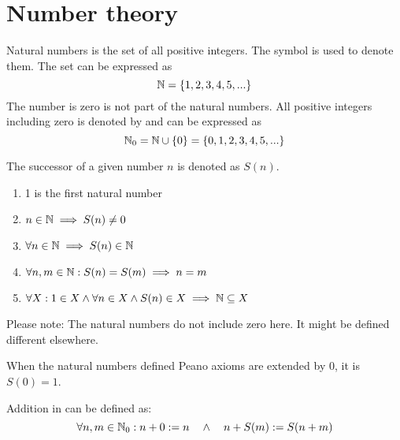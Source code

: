 \chapter{Number theory}

\begin{definition}
    Natural numbers is the set of all positive integers.
    The symbol \N{} is used to denote them.
    The set can be expressed as
    \begin{equation}
        \mathbb{N} = \{1,2,3,4,5,... \}
    \end{equation}
    The number is zero is not part of the natural numbers.
    All positive integers including zero is denoted by \Nzero{} and can be expressed as
    \begin{equation}
        \mathbb{N}_0 = \mathbb{N} \cup \{0\} = \{0, 1,2,3,4,5,... \}
    \end{equation}
\end{definition}

\begin{definition}
    The successor of a given number $n$ is denoted as $S(n)$.
    \begin{enumerate}
        \item 1 is the first natural number
        \item $n \in \mathbb{N} \implies S(n) \ne 0$
        \item $\forall n \in \mathbb{N} \implies S(n) \in \mathbb{N}$
        \item $\forall n,m \in \mathbb{N}: S(n) = S(m) \implies n=m$
        \item $\forall X: 1 \in X \land \forall n \in X \land S(n) \in X \implies \mathbb{N} \subseteq X$
    \end{enumerate}
    Please note: The natural numbers do not include zero here. 
    It might be defined different elsewhere.
\end{definition}

\begin{corollary}
    When the natural numbers defined Peano axioms are extended by 0,
    it is $S(0)=1$.
\end{corollary}

\begin{definition}
    Addition in \Nzero{} can be defined as:
    \begin{equation}
        \forall n,m \in \mathbb{N}_0: n+0:=n \quad \land \quad n + S(m) := S(n + m)
    \end{equation}
\end{definition}

